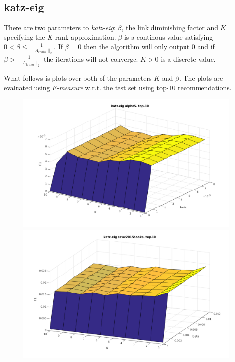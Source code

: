 
\subsection{katz-eig}

There are two parameters to \textit{katz-eig}: $\beta$, the link diminishing factor and $K$ specifying the $K$-rank approximation. $\beta$ is a continous value satisfying $0 < \beta \leq \frac{1}{\|A_{train}\|_2}$. If $\beta = 0$ then the algorithm will only output 0 and if $\beta > \frac{1}{\|A_{train}\|_2}$ the iterations will not converge. $K > 0$ is a discrete value.

What follows is plots over both of the parameters $K$ and $\beta$. The plots are evaluated using \textit{F-measure} w.r.t. the test set using top-10 recommendations.

\begin{figure}[h!]
\centering
\begin{minipage}{.5\textwidth}
    \centering
    \includegraphics[width=\linewidth]{fig/katzeig_beta_k/alphaS_katzeig.png}
\end{minipage}%
\begin{minipage}{.5\textwidth}
    \centering
    \includegraphics[width=\linewidth]{fig/katzeig_beta_k/eswc2015books_katzeig.png}
\end{minipage}
\end{figure}

